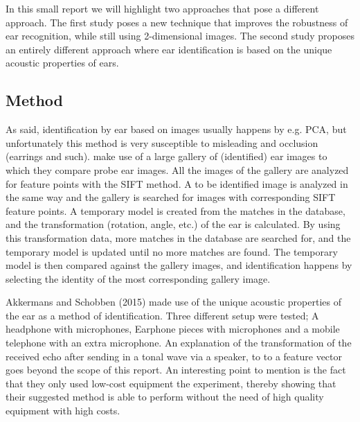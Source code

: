 \documentclass[10pt]{article}
\begin{document}
In this small report we will highlight two approaches that pose a different approach.
The first study\cite{bustard2008robust} poses a new technique that improves the robustness of ear recognition,
while still using 2-dimensional images. The second study\cite{akkermans2005acoustic} proposes an entirely different approach 
where ear identification is based on the unique acoustic properties of ears.

\subsection{Method}
As said, identification by ear based on images usually happens by e.g. PCA, but unfortunately this method is very susceptible to misleading and occlusion (earrings and such).
\cite{bustard2008robust} make use of a large gallery of (identified) ear images to which they compare probe ear images.
All the images of the gallery are analyzed for feature points with the SIFT\cite{lowe1999object} method.
A to be identified image is analyzed in the same way and the gallery is searched for images with corresponding SIFT feature points.
A temporary model is created from the matches in the database, and the transformation (rotation, angle, etc.) of the ear is calculated.
By using this transformation data, more matches in the database are searched for, and the temporary model is updated until no more matches are found.
The temporary model is then compared against the gallery images, and identification happens by selecting the identity of the most corresponding gallery image.

Akkermans and Schobben (2015) made use of the unique acoustic properties of the ear as a method of identification. 
Three different setup were tested; A headphone with microphones, Earphone pieces with microphones and a mobile telephone with an extra microphone.
An explanation of the transformation of the received echo after sending in a tonal wave via a speaker, to to a feature vector goes beyond the scope of this 
report. An interesting point to mention is the fact that they only used low-cost equipment the experiment,
thereby showing that their suggested method is able to perform without the need of high quality equipment with high costs.
\end{document}

